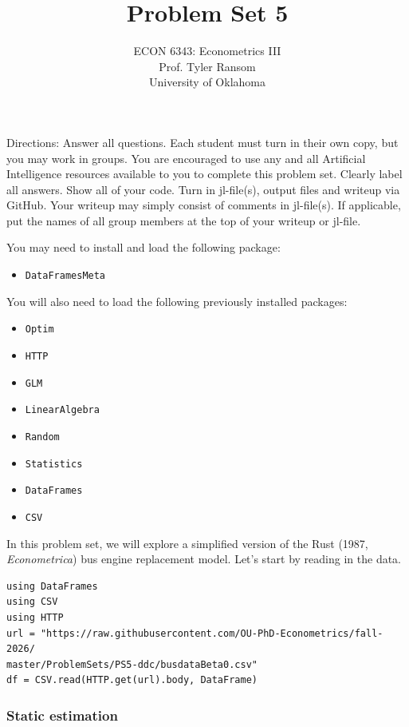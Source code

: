 \documentclass[12pt,english]{article}
\begin{document}
\title{Problem Set 5}
\author{ECON 6343: Econometrics III\\
Prof. Tyler Ransom\\
University of Oklahoma}
\date{}%

\maketitle
Directions: Answer all questions. Each student must turn in their own copy, but you may work in groups. You are encouraged to use any and all Artificial Intelligence resources available to you to complete this problem set. Clearly label all answers. Show all of your code. Turn in jl-file(s), output files and writeup via GitHub. Your writeup may simply consist of comments in jl-file(s). If applicable, put the names of all group members at the top of your writeup or jl-file.

You may need to install and load the following package:
\begin{itemize}
    \item[~] \texttt{DataFramesMeta}
\end{itemize}

You will also need to load the following previously installed packages:
\begin{itemize}
    \item[~] \texttt{Optim} 
    \item[~] \texttt{HTTP} 
    \item[~] \texttt{GLM} 
    \item[~] \texttt{LinearAlgebra} 
    \item[~] \texttt{Random} 
    \item[~] \texttt{Statistics} 
    \item[~] \texttt{DataFrames} 
    \item[~] \texttt{CSV} 
\end{itemize}
\pagebreak
In this problem set, we will explore a simplified version of the Rust (1987, \textit{Econometrica}) bus engine replacement model. Let's start by reading in the data.

\begin{verbatim}
using DataFrames
using CSV
using HTTP
url = "https://raw.githubusercontent.com/OU-PhD-Econometrics/fall-2026/
master/ProblemSets/PS5-ddc/busdataBeta0.csv"
df = CSV.read(HTTP.get(url).body, DataFrame)
\end{verbatim}


\subsubsection*{Static estimation}
\end{document}
